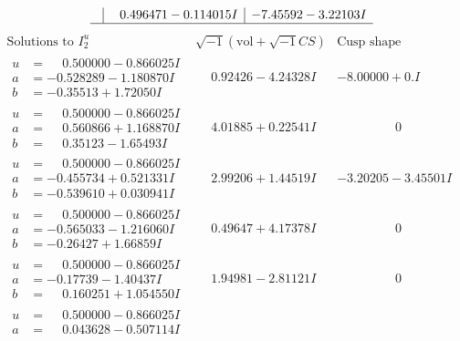 \documentclass[1p]{elsarticle_modified}
\theoremstyle{definition}
\newcommand{\I}{\sqrt{-1}}
\begin{document}
$$\begin{array}{c|c|c}
 & \phantom{-}0.496471 - 0.114015 I & -7.45592 - 3.22103 I\\
 \hline 
 \end{array}$$\newpage$$\begin{array}{c|c|c}  
\text{Solutions to }I^u_{2}& \I (\text{vol} + \sqrt{-1}CS) & \text{Cusp shape}\\
 \hline 
\begin{aligned}
u &= \phantom{-}0.500000 - 0.866025 I \\
a &= -0.528289 - 1.180870 I \\
b &= -0.35513 + 1.72050 I\end{aligned}
 & \phantom{-}0.92426 - 4.24328 I & -8.00000 + 0. I\phantom{ +0.000000I} \\ \hline\begin{aligned}
u &= \phantom{-}0.500000 - 0.866025 I \\
a &= \phantom{-}0.560866 + 1.168870 I \\
b &= \phantom{-}0.35123 - 1.65493 I\end{aligned}
 & \phantom{-}4.01885 + 0.22541 I & \phantom{-0.000000 } 0 \\ \hline\begin{aligned}
u &= \phantom{-}0.500000 - 0.866025 I \\
a &= -0.455734 + 0.521331 I \\
b &= -0.539610 + 0.030941 I\end{aligned}
 & \phantom{-}2.99206 + 1.44519 I & -3.20205 - 3.45501 I \\ \hline\begin{aligned}
u &= \phantom{-}0.500000 - 0.866025 I \\
a &= -0.565033 - 1.216060 I \\
b &= -0.26427 + 1.66859 I\end{aligned}
 & \phantom{-}0.49647 + 4.17378 I & \phantom{-0.000000 } 0 \\ \hline\begin{aligned}
u &= \phantom{-}0.500000 - 0.866025 I \\
a &= -0.17739 - 1.40437 I \\
b &= \phantom{-}0.160251 + 1.054550 I\end{aligned}
 & \phantom{-}1.94981 - 2.81121 I & \phantom{-0.000000 } 0 \\ \hline\begin{aligned}
u &= \phantom{-}0.500000 - 0.866025 I \\
a &= \phantom{-}0.043628 - 0.507114 I \\

\end{aligned}
\end{array}$$
\end{document}
